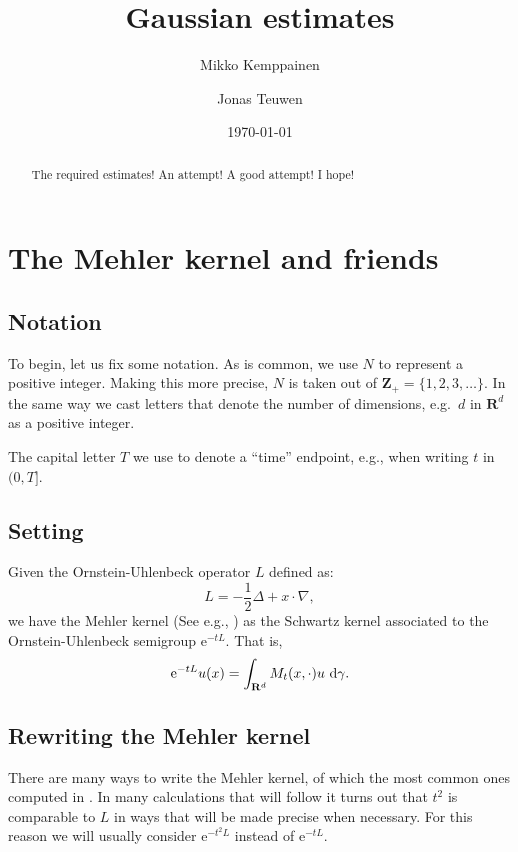 \documentclass[a4paper,oneside,10pt]{amsproc}
\title[Gaussian estimates]{Gaussian estimates}
\author{Mikko Kemppainen}
\author{Jonas Teuwen}%
\date{\today}
\theoremstyle{plain}
\theoremstyle{remark}
\theoremstyle{definition}
\newcommand{\D}{\,\textup{d}}
\newcommand{\R}{\mathbf R}
\newcommand{\Z}{\mathbf Z}
\newcommand{\e}{\mathrm{e}} %
\begin{document}
\begin{abstract}
  The required estimates! An attempt! A good attempt! I hope!
\end{abstract}


\maketitle
\section{The Mehler kernel and friends}
\subsection{Notation}
To begin, let us fix some notation. As is common, we use $N$ to
represent a positive integer. Making this more precise, $N$ is taken
out of $\Z_+ = \{1, 2, 3, \dots\}$. In the same way we cast letters
that denote the number of dimensions, e.g.\ $d$ in $\R^d$ as a
positive integer.

The capital letter $T$ we use to denote a ``time'' endpoint, e.g.,
when writing $t$ in $(0, T]$.

\subsection{Setting}
Given the Ornstein-Uhlenbeck operator $L$ defined as:
\begin{equation}
  \label{eq:Ornstein-Uhlenbeck-operator}
  L = -\frac12 \Delta + x \cdot \nabla,
\end{equation}
we have the Mehler kernel (See e.g., \cite{Sjogren1997}) as the
Schwartz kernel associated to the Ornstein-Uhlenbeck semigroup
$\e^{-tL}$. That is, 
\begin{equation}
  \label{eq:Ornstein-Uhlenbeck-semigroup-integral}
  \e^{-tL} u(x) = \int_{\R^d} M_t(x, \cdot) u \, \D\gamma.
\end{equation}

\subsection{Rewriting the Mehler kernel}
There are many ways to write the Mehler kernel, of which the most
common ones computed in \textcite{Sjogren1997}. In many calculations
that will follow it turns out that $t^2$ is comparable to $L$ in ways
that will be made precise when necessary. For this reason we will usually
consider $\e^{-t^2 L}$ instead of $\e^{-t L}$. 
\end{document}
